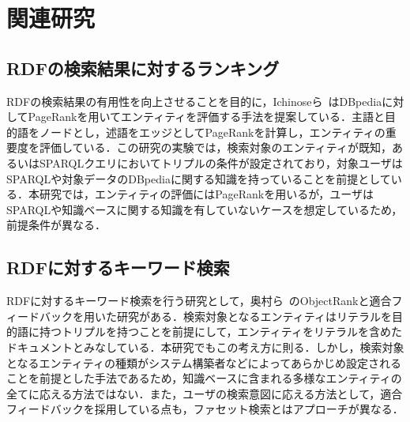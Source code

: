 \section{関連研究}
\label{sec:related}
\subsection{RDFの検索結果に対するランキング}
RDFの検索結果の有用性を向上させることを目的に，Ichinoseら~\cite{Ichinose2013RankingTR}はDBpediaに対してPageRankを用いてエンティティを評価する手法を提案している．主語と目的語をノードとし，述語をエッジとしてPageRankを計算し，エンティティの重要度を評価している．この研究の実験では，検索対象のエンティティが既知，あるいはSPARQLクエリにおいてトリプルの条件が設定されており，対象ユーザはSPARQLや対象データのDBpediaに関する知識を持っていることを前提としている．本研究では，エンティティの評価にはPageRankを用いるが，ユーザはSPARQLや知識ベースに関する知識を有していないケースを想定しているため，前提条件が異なる．

\subsection{RDFに対するキーワード検索}
RDFに対するキーワード検索を行う研究として，奥村ら~\cite{okumura}のObjectRankと適合フィードバックを用いた研究がある．検索対象となるエンティティはリテラルを目的語に持つトリプルを持つことを前提にして，エンティティをリテラルを含めたドキュメントとみなしている．本研究でもこの考え方に則る．しかし，検索対象となるエンティティの種類がシステム構築者などによってあらかじめ設定されることを前提とした手法であるため，知識ベースに含まれる多様なエンティティの全てに応える方法ではない．また，ユーザの検索意図に応える方法として，適合フィードバックを採用している点も，ファセット検索とはアプローチが異なる．

